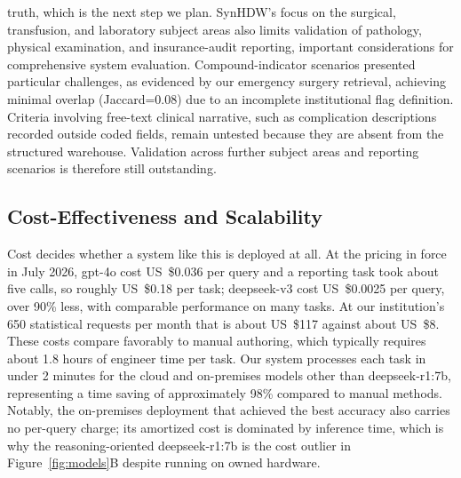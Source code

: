 \documentclass[applsci,article,submit,pdftex,oneauthor]{Definitions/mdpi}
\begin{document}
truth, which is the next step we plan. SynHDW's
focus on the surgical, transfusion, and laboratory subject areas also limits
validation of pathology, physical examination, and insurance-audit reporting,
important considerations for comprehensive system evaluation. Compound-indicator
scenarios presented particular challenges, as evidenced by our emergency surgery
retrieval, achieving minimal overlap (Jaccard=0.08) due to an incomplete
institutional flag definition. Criteria involving free-text clinical narrative,
such as complication descriptions recorded outside coded fields, remain untested
because they are absent from the structured warehouse. Validation across further subject areas and reporting scenarios is therefore still outstanding.

\subsection{Cost-Effectiveness and Scalability}
Cost decides whether a system like this is deployed at all. At the pricing in force in July 2026, gpt-4o cost US~\$0.036 per query and a reporting task took about five calls, so roughly US~\$0.18 per task; deepseek-v3 cost US~\$0.0025 per query, over 90\% less, with comparable performance on many tasks. At our institution's 650 statistical requests per month that is about US~\$117 against about US~\$8. These costs compare favorably to manual authoring, which typically
requires about 1.8 hours of engineer time per task. Our system processes
each task in under 2 minutes for the cloud and on-premises models other than
deepseek-r1:7b, representing a time saving of approximately 98\% compared to
manual methods. Notably, the on-premises deployment that achieved the best
accuracy also carries no per-query charge; its amortized cost is dominated by
inference time, which is why the reasoning-oriented deepseek-r1:7b is the cost
outlier in Figure~\ref{fig:models}B despite running on owned hardware.
\end{document}

